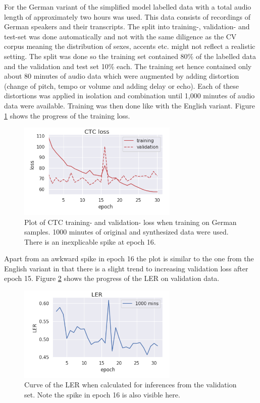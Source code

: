 \documentclass[letterpaper]{article}
\begin{document}
For the German variant of the simplified model labelled data with a total audio length of approximately two hours was used. This data consists of recordings of German speakers and their transcripts. The split into training-, validation- and test-set was done automatically and not with the same diligence as the CV corpus meaning the distribution of sexes, accents etc. might not reflect a realistic setting. The split was done so the training set contained 80\% of the labelled data and the validation and test set 10\% each. The training set hence contained only about 80 minutes of audio data which were augmented by adding distortion (change of pitch, tempo or volume and adding delay or echo). Each of these distortions was applied in isolation and combination until 1,000 minutes of audio data were available. Training was then done like with the English variant. Figure \ref{loss_de} shows the progress of the training loss.

\begin{figure}[!htb]
	\begin{center}
		\includegraphics[width=3in]{loss_de.png}
		\caption{Plot of CTC training- and validation- loss when training on German samples. 1000 minutes of original and synthesized data were used. There is an inexplicable spike at epoch 16.}
		\label{loss_de}
	\end{center}
\end{figure}

Apart from an awkward spike in epoch 16 the plot is similar to the one from the English variant in that there is a slight trend to increasing validation loss after epoch 15. Figure \ref{ler_de} shows the progress of the LER on validation data.

\begin{figure}[!htb]
	\begin{center}
		\includegraphics[width=3in]{ler_de.png}
		\caption{Curve of the LER when calculated for inferences from the validation set. Note the spike in epoch 16 is also visible here.}
		\label{ler_de}
	\end{center}
\end{figure}
\end{document}
